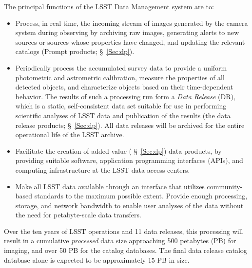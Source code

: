 The principal functions of the LSST Data Management system are to:
\begin{itemize}
\item Process, in real time, the incoming stream of images generated by the camera system during observing by archiving raw images, generating alerts to new sources or sources whose properties have changed, and updating the relevant catalogs (Prompt  products; \S~\ref{Sec:dp}).
\item Periodically process the accumulated survey data to provide a
  uniform photometric and astrometric calibration, measure the
  properties of all detected objects, and characterize objects based on their time-dependent behavior. The results of such a processing run form a {\em Data Release} (DR), which is a static, self-consistent data set suitable for use in performing scientific analyses of LSST data and publication of the results (the data release products; \S~\ref{Sec:dp}). All data releases will be archived for the entire operational life of the LSST archive.
\item Facilitate the creation of added value (
  \S~\ref{Sec:dp}) data products, by providing suitable software,
  application programming interfaces (APIs),
and computing infrastructure at the LSST data access centers.
\item Make all LSST data available through an interface that utilizes
community-based standards   to the maximum possible extent. Provide
  enough processing, storage, and network bandwidth to enable user
  analyses of the data without the need for petabyte-scale data
  transfers.
\end{itemize}

Over the ten years of LSST operations and 11 data releases, this processing will result in a cumulative {\em processed} data size
approaching 500 petabytes (PB) for imaging, and over 50 PB for the
catalog databases. The final data release catalog database alone is expected
to be approximately 15 PB in size.
\\

 
